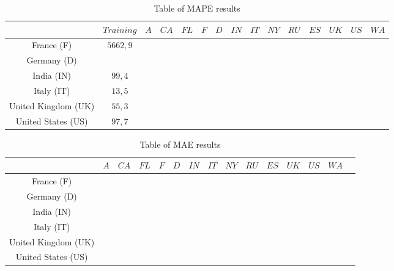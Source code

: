 \documentclass[letterpaper]{article}%
\begin{document}
\setlength\extrarowheight{5pt}
\begin{table}[!h]
	\caption{Table of MAPE results }
	\label{result}
	\begin{tabular}{ccccccccccccccc}
		   &$Training$&$A$&$CA$&$FL$&$F$&$D$&$IN$&$IT$&$NY$&$RU$&$ES$&$UK$&$US$&$WA$\\
	\hline
		France (F) & $5662,9$ &  &  &  &  &  &  &  &  &  &  & \\\hline 		%
		Germany (D) &  &  &  &  &  &  &  &  &  &  &  & \\\hline 				%
		India (IN) &  $99,4$ &  &  &  &  &  &  &  &  &  & \\\hline 			%
		Italy (IT) & $13,5$ &  &  &  &  &  &  &  &  &  &  & \\\hline 			%
		United Kingdom (UK) & $55,3$ &  &  &  &  &  &  &  &  &  &  & \\\hline 	%
		United States (US) &  $97,7$ &  &  &  &  &  &  &  &  &  &  & \\\hline 		%
	\end{tabular}

	\label{tab:params}
\end{table}

\setlength\extrarowheight{5pt}
\begin{table}[!h]
	\caption{Table of MAE results }
	\label{result}
	\begin{tabular}{ccccccccccccccc}
		   &$A$&$CA$&$FL$&$F$&$D$&$IN$&$IT$&$NY$&$RU$&$ES$&$UK$&$US$&$WA$\\
	\hline
		France (F) &  &  &  &  &  &  &  &  &  &  &  & \\\hline
		Germany (D) &  &  &  &  &  &  &  &  &  &  &  & \\\hline
		India (IN) &  &  &  &  &  &  &  &  &  &  &  & \\\hline
		Italy (IT) &  &  &  &  &  &  &  &  &  &  &  & \\\hline
		United Kingdom (UK) &  &  &  &  &  &  &  &  &  &  &  & \\\hline
		United States (US) &  $$ &  &  &  &  &  &  &  &  &  &  & \\\hline
	\end{tabular}

	\label{tab:params}
\end{table}
\clearpage
\twocolumn
\clearpage
\onecolumn
\end{document}
